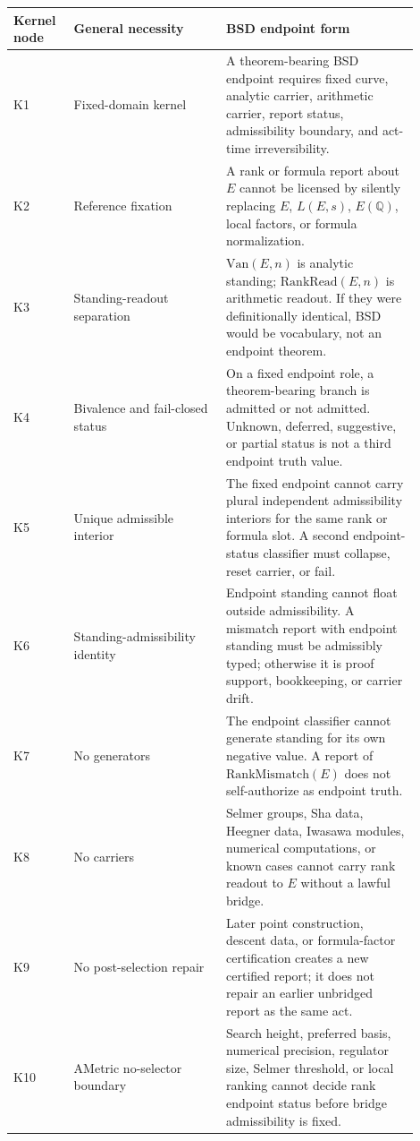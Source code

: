 \documentclass[11pt]{article}
\newcommand{\Q}{\mathbb{Q}}
\newcommand{\Van}{\mathrm{Van}}
\newcommand{\RankRead}{\mathrm{RankRead}}
\newcommand{\RankMismatch}{\mathrm{RankMismatch}}
\begin{document}
\begin{longtable}{L{0.13\linewidth}L{0.34\linewidth}L{0.43\linewidth}}
\toprule
\textbf{Kernel node} & \textbf{General necessity} & \textbf{BSD endpoint form}\\
\midrule
K1 & Fixed-domain kernel & A theorem-bearing BSD endpoint requires fixed curve, analytic carrier, arithmetic carrier, report status, admissibility boundary, and act-time irreversibility.\\
K2 & Reference fixation & A rank or formula report about $E$ cannot be licensed by silently replacing $E$, $L(E,s)$, $E(\Q)$, local factors, or formula normalization.\\
K3 & Standing-readout separation & $\Van(E,n)$ is analytic standing; $\RankRead(E,n)$ is arithmetic readout. If they were definitionally identical, BSD would be vocabulary, not an endpoint theorem.\\
K4 & Bivalence and fail-closed status & On a fixed endpoint role, a theorem-bearing branch is admitted or not admitted. Unknown, deferred, suggestive, or partial status is not a third endpoint truth value.\\
K5 & Unique admissible interior & The fixed endpoint cannot carry plural independent admissibility interiors for the same rank or formula slot. A second endpoint-status classifier must collapse, reset carrier, or fail.\\
K6 & Standing-admissibility identity & Endpoint standing cannot float outside admissibility. A mismatch report with endpoint standing must be admissibly typed; otherwise it is proof support, bookkeeping, or carrier drift.\\
K7 & No generators & The endpoint classifier cannot generate standing for its own negative value. A report of $\RankMismatch(E)$ does not self-authorize as endpoint truth.\\
K8 & No carriers & Selmer groups, Sha data, Heegner data, Iwasawa modules, numerical computations, or known cases cannot carry rank readout to $E$ without a lawful bridge.\\
K9 & No post-selection repair & Later point construction, descent data, or formula-factor certification creates a new certified report; it does not repair an earlier unbridged report as the same act.\\
K10 & AMetric no-selector boundary & Search height, preferred basis, numerical precision, regulator size, Selmer threshold, or local ranking cannot decide rank endpoint status before bridge admissibility is fixed.\\

\end{longtable}
\end{document}
